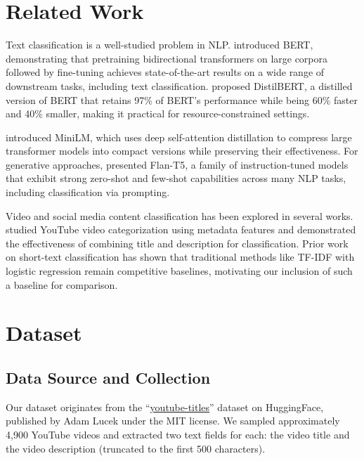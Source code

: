 \documentclass[11pt]{article}
\begin{document}
\section{Related Work}

Text classification is a well-studied problem in NLP. \citet{devlin2019bert} introduced BERT, demonstrating that pretraining bidirectional transformers on large corpora followed by fine-tuning achieves state-of-the-art results on a wide range of downstream tasks, including text classification. \citet{sanh2019distilbert} proposed DistilBERT, a distilled version of BERT that retains 97\% of BERT's performance while being 60\% faster and 40\% smaller, making it practical for resource-constrained settings.

\citet{wang2020minilm} introduced MiniLM, which uses deep self-attention distillation to compress large transformer models into compact versions while preserving their effectiveness. For generative approaches, \citet{chung2022scaling} presented Flan-T5, a family of instruction-tuned models that exhibit strong zero-shot and few-shot capabilities across many NLP tasks, including classification via prompting.

Video and social media content classification has been explored in several works. \citet{khan2020youtube} studied YouTube video categorization using metadata features and demonstrated the effectiveness of combining title and description for classification. Prior work on short-text classification \citep{wang2012baselines} has shown that traditional methods like TF-IDF with logistic regression remain competitive baselines, motivating our inclusion of such a baseline for comparison.

\section{Dataset}

\subsection{Data Source and Collection}

Our dataset originates from the ``\href{https://huggingface.co/datasets/AdamLucek/youtube-titles}{youtube-titles}'' dataset on HuggingFace, published by Adam Lucek under the MIT license. We sampled approximately 4,900 YouTube videos and extracted two text fields for each: the video title and the video description (truncated to the first 500 characters). 
\end{document}
